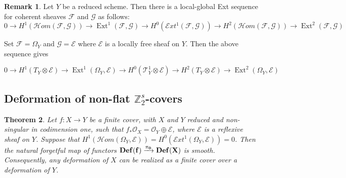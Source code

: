 \documentclass[12pt,twoside,]{amsart}
\theoremstyle{plain}
\newtheorem{theorem}{Theorem}[subsection]
\theoremstyle{definition}
\newtheorem{remark}[theorem]{Remark}
\begin{document}
\begin{remark}\label{local-global}
Let $Y$ be a reduced scheme. Then there is a local-global Ext sequence for coherent sheaves $\mathcal{F}$ and $\mathcal{G}$ as follows:
\begin{equation*}
 0 \to H^1(\mathcal{H}om(\mathcal{F}, \mathcal{G})) \to \operatorname{Ext}^1(\mathcal{F}, \mathcal{G}) \to H^0(\mathcal{E}xt^1(\mathcal{F}, \mathcal{G})) \to H^2(\mathcal{H}om(\mathcal{F}, \mathcal{G})) \to \operatorname{Ext}^2(\mathcal{F}, \mathcal{G})
 \end{equation*}

Set $\mathcal{F} = \Omega_Y$ and $\mathcal{G} = \mathcal{E}$ where  $\mathcal{E}$ is a locally free sheaf on $Y$. Then the above sequence gives

\begin{equation}\label{twisted local-global}
    0 \to H^1(T_Y \otimes \mathcal{E}) \to \operatorname{Ext}^1(\Omega_Y, \mathcal{E}) \to H^0(\mathcal{T}_Y^1 \otimes \mathcal{E}) \to H^2(T_Y \otimes \mathcal{E}) \to \operatorname{Ext}^2(\Omega_Y, \mathcal{E})
\end{equation}
\end{remark}





\subsection{Deformation of non-flat 
$\mathbb{Z}_2^s$-covers}

\begin{theorem}\label{every def is a finite cover revised reflexive}
    Let $f: X \to Y$ be a finite cover, with $X$ and $Y$ reduced and non-singular in codimension one, such that $f_*\mathcal{O}_X = \mathcal{O}_Y \oplus \mathcal{E}$, where $\mathcal{E}$ is a reflexive sheaf on $Y$. Suppose that $H^1(\mathcal{H}om(\Omega_Y, \mathcal{E})) = H^0(\mathcal{E}xt^1(\Omega_Y, \mathcal{E})) = 0$. Then the natural forgetful map of functors $\bf Def(f) \xrightarrow{\pi_0} \bf Def(X)$ is smooth. Consequently, any deformation of $X$ can be realized as a finite cover over a deformation of $Y$. 
\end{theorem}
\end{document}

